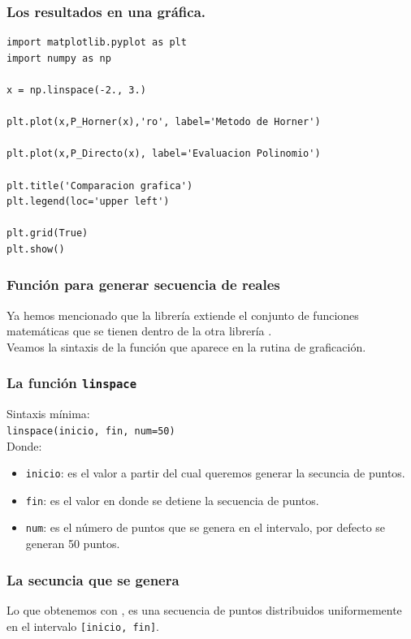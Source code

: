 \begin{frame}
\frametitle{Los resultados en una gráfica.}
\fontsize{14}{14}\selectfont
\begin{lstlisting}[caption=Elaboración de la gráfica, basicstyle=\linespread{1.2}\ttfamily\small, columns=fullflexible]
import matplotlib.pyplot as plt
import numpy as np

x = np.linspace(-2., 3.)

plt.plot(x,P_Horner(x),'ro', label='Metodo de Horner')

plt.plot(x,P_Directo(x), label='Evaluacion Polinomio')

plt.title('Comparacion grafica')
plt.legend(loc='upper left')

plt.grid(True)
plt.show()
\end{lstlisting}
\end{frame}
\begin{frame}\frametitle{Función para generar secuencia de reales}
Ya hemos mencionado que la librería  extiende el conjunto de funciones matemáticas que se tienen dentro de la otra librería .
\\
\bigskip
Veamos la sintaxis de la función  que aparece en la rutina de graficación.
\end{frame}
\begin{frame}
\frametitle{La función \texttt{linspace}}
Sintaxis mínima:
\\
\medskip
\texttt{linspace(inicio, fin, num=50)}
\\
\medskip
Donde:
\begin{itemize}
\item \texttt{inicio}: es el valor a partir del cual queremos generar la secuncia de puntos.
\item \texttt{fin}: es el valor en donde se detiene la secuencia de puntos.
\item \texttt{num}: es el número de puntos que se genera en el intervalo, por defecto se generan 50 puntos.
\end{itemize}
\end{frame}
\begin{frame}
\frametitle{La secuncia que se genera}
Lo que obtenemos con , es una secuencia de puntos distribuidos uniformemente en el intervalo \texttt{[inicio, fin]}.
\end{frame}

